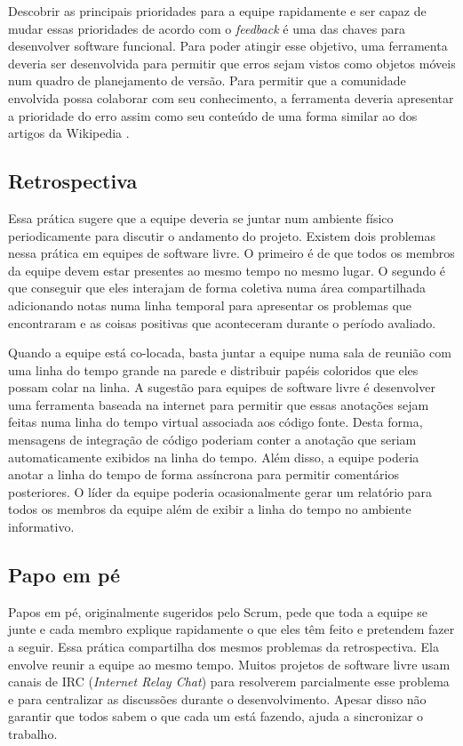 Descobrir as principais prioridades para a equipe rapidamente e ser
capaz de mudar essas prioridades de acordo com o \emph{feedback} é uma
das chaves para desenvolver software funcional. Para poder atingir
esse objetivo, uma ferramenta deveria ser desenvolvida para permitir
que erros sejam vistos como objetos móveis num quadro de planejamento
de versão. Para permitir que a comunidade envolvida possa colaborar
com seu conhecimento, a ferramenta deveria apresentar a prioridade do
erro assim como seu conteúdo de uma forma similar ao dos artigos da
Wikipedia \cite{Surowiecki2004,Tapscott2006,Benkler2006}.

\subsection{Retrospectiva}
\label{subsec:retrospect}

Essa prática sugere que a equipe deveria se juntar num ambiente físico
periodicamente para discutir o andamento do projeto. Existem dois
problemas nessa prática em equipes de software livre. O primeiro é de
que todos os membros da equipe devem estar presentes ao mesmo tempo no
mesmo lugar. O segundo é que conseguir que eles interajam de forma
coletiva numa área compartilhada adicionando notas numa linha temporal
para apresentar os problemas que encontraram e as coisas positivas que
aconteceram durante o período avaliado.

Quando a equipe está co-locada, basta juntar a equipe numa sala de
reunião com uma linha do tempo grande na parede e distribuir papéis
coloridos que eles possam colar na linha. A sugestão para equipes de
software livre é desenvolver uma ferramenta baseada na internet para
permitir que essas anotações sejam feitas numa linha do tempo virtual
associada aos código fonte. Desta forma, mensagens de integração de
código poderiam conter a anotação que seriam automaticamente exibidos
na linha do tempo. Além disso, a equipe poderia anotar a linha do
tempo de forma assíncrona para permitir comentários posteriores. O
líder da equipe poderia ocasionalmente gerar um relatório para todos
os membros da equipe além de exibir a linha do tempo no ambiente
informativo.

\subsection{Papo em pé}
\label{subsec:stand-up}

Papos em pé, originalmente sugeridos pelo Scrum, pede que toda a
equipe se junte e cada membro explique rapidamente o que eles têm
feito e pretendem fazer a seguir. Essa prática compartilha dos mesmos
problemas da retrospectiva. Ela envolve reunir a equipe ao mesmo
tempo. Muitos projetos de software livre usam canais de IRC
(\emph{Internet Relay Chat}) para resolverem parcialmente esse
problema e para centralizar as discussões durante o
desenvolvimento. Apesar disso não garantir que todos sabem o que cada
um está fazendo, ajuda a sincronizar o trabalho.

